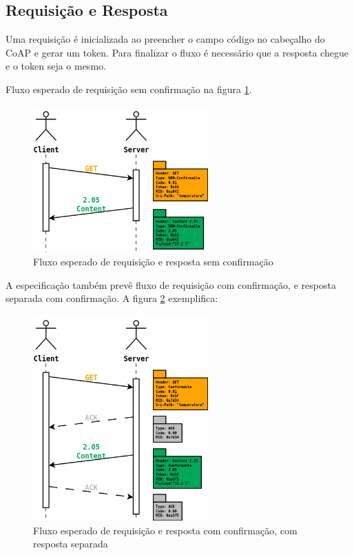 \subsection{Requisi\c{c}\~ao e Resposta}

Uma requisi\c{c}\~ao \'e inicializada ao preencher o campo c\'odigo no cabe\c{c}alho do CoAP e gerar um token.
Para finalizar o fluxo \'e necess\'ario que a resposta chegue e o token seja o mesmo.

Fluxo esperado de requisi\c{c}\~ao sem confirma\c{c}\~ao na figura \ref{nonConfirmable}.
\begin{figure}[H]
   \label{nonConfirmable}
   \centering
   \includegraphics[width=0.6\textwidth]{figuras/nonconfirmable.png}
   \caption{Fluxo esperado de requisi\c{c}\~ao e resposta sem confirma\c{c}\~ao}
\end{figure}

A especifica\c{c}\~ao tamb\'em prev\^e fluxo de requisi\c{c}\~ao com confirma\c{c}\~ao, e resposta separada com confirma\c{c}\~ao. A figura \ref{separateResponse} exemplifica:

\begin{figure}[H]
   \label{separateResponse}
   \centering
   \includegraphics[width=0.6\textwidth]{figuras/separateresponse.png}
   \caption{Fluxo esperado de requisi\c{c}\~ao e resposta com confirma\c{c}\~ao, com resposta separada}
\end{figure}

